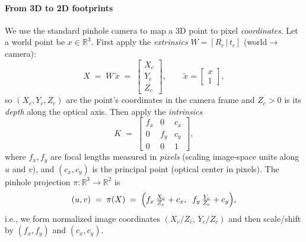 \begin{enrichment}
\begin{enrichment}
\begin{enrichment}
        \paragraph{From 3D to 2D footprints}
        We use the standard pinhole camera to map a 3D point to pixel \emph{coordinates}. 
        Let a world point be $x\in\mathbb{R}^3$. 
        First apply the \emph{extrinsics} $W=[R_c\,|\,t_c]$ (world$\to$camera): 
        \[
        X \;=\; W\,\tilde{x} \;=\; 
        \begin{bmatrix} X_c \\ Y_c \\ Z_c \end{bmatrix},
        \qquad 
        \tilde{x}=\begin{bmatrix}x\\1\end{bmatrix},
        \]
        so $(X_c,Y_c,Z_c)$ are the point’s coordinates in the camera frame and $Z_c{>}0$ is its \emph{depth} along the optical axis.
        Then apply the \emph{intrinsics} 
        \[
        K \;=\; 
        \begin{bmatrix}
            f_x & 0 & c_x\\[2pt]
            0 & f_y & c_y\\[2pt]
            0 & 0 & 1
        \end{bmatrix},
        \]
        where $f_x,f_y$ are focal lengths measured in \emph{pixels} (scaling image-space units along $u$ and $v$), and $(c_x,c_y)$ is the principal point (optical center in pixels). 
        The pinhole projection $\pi:\mathbb{R}^3\to\mathbb{R}^2$ is
        \[
        (u,v) \;=\; \pi(X) \;=\; 
        \Bigl(f_x\,\tfrac{X_c}{Z_c} + c_x,\;\; f_y\,\tfrac{Y_c}{Z_c} + c_y\Bigr),
        \]
        i.e., we form normalized image coordinates $(X_c/Z_c,\,Y_c/Z_c)$ and then scale/shift by $(f_x,f_y)$ and $(c_x,c_y)$.
        
        \medskip
        

\end{enrichment}
\end{enrichment}
\end{enrichment}
